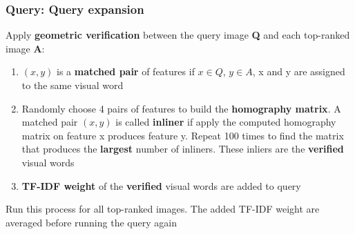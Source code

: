 \begin{frame}
    \frametitle{Query: Query expansion}
    Apply \textbf{geometric verification} between the query image \textbf{Q} and each top-ranked image \textbf{A}:
    \begin{enumerate}
        \item $(x,y)$ is a \textbf{matched pair} of features if $x \in Q$, $y \in A$, x and y are assigned to the same visual word
        \item Randomly choose 4 pairs of features to build the \textbf{homography matrix}. A matched pair $(x,y)$ is called \textbf{inliner} if apply the computed homography matrix on feature x produces feature y. Repeat 100 times to find the matrix that produces the \textbf{largest} number of inliners. These inliers are the \textbf{verified} visual words
        \item \textbf{TF-IDF weight} of the \textbf{verified} visual words are added to query
    \end{enumerate}
    Run this process for all top-ranked images. The added TF-IDF weight are averaged before running the query again
\end{frame}

